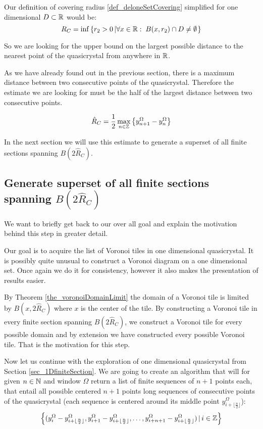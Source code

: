 \documentclass[text.tex]{subfiles}
\begin{document}
Our definition of covering radius \ref{def_deloneSetCovering} simplified for one dimensional $D\subset\mathbb{R}$ would be: 
$$R_C = \inf\left\{ r_2>0\left| \forall x\in\mathbb{R}:\; B(x,r_2)\cap D \neq \emptyset \right. \right\}$$

So we are looking for the upper bound on the largest possible distance to the nearest point of the quasicrystal from anywhere in $\mathbb{R}$. 

As we have already found out in the previous section, there is a maximum distance between two consecutive points of the quasicrystal. Therefore the estimate we are looking for must be the half of the largest distance between two consecutive points. 

$$\hat{R}_C = \frac{1}{2}\max_{n\in\mathbb{Z}}\big\{y^\Omega_{n+1}-y^\Omega_n\big\}$$

In the next section we will use this estimate to generate a superset of all finite sections spanning $B(2\hat{R}_C)$. 

\subsection{Generate superset of all finite sections spanning $B(2\hat{R}_C)$}
We want to briefly get back to our over all goal and explain the motivation behind this step in greater detail. 

Our goal is to acquire the list of Voronoi tiles in one dimensional quasicrystal. It is possibly quite unusual to construct a Voronoi diagram on a one dimensional set. Once again we do it for consistency, however it also makes the presentation of results easier. 

By Theorem \ref{the_voronoiDomainLimit} the domain of a Voronoi tile is limited by $B(x, 2\hat{R}_C)$ where $x$ is the center of the tile. By constructing a Voronoi tile in every finite section spanning $B(2\hat{R}_C)$, we construct a Voronoi tile for every possible domain and by extension we have constructed every possible Voronoi tile. That is the motivation for this step. 

Now let us continue with the exploration of one dimensional quasicrystal from Section \ref{sec_1DfiniteSection}. We are going to create an algorithm that will for given $n\in\mathbb{N}$ and window $\Omega$ return a list of finite sequences of $n+1$ points each, that entail all possible centered $n+1$ points long sequences of consecutive points of the quasicrystal (each sequence is centered around its middle point $y^\Omega_{i+\lfloor\frac{n}{2}\rfloor}$): 
$$\left\{ (y^\Omega_{i}-y^\Omega_{i+\lfloor\frac{n}{2}\rfloor}, y^\Omega_{i+1}-y^\Omega_{i+\lfloor\frac{n}{2}\rfloor}, \dots, y^\Omega_{i+n+1}-y^\Omega_{i+\lfloor\frac{n}{2}\rfloor} )\,|\, i\in\mathbb{Z} \right\}$$
\end{document}
